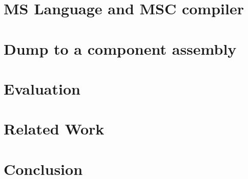 \documentclass{acm_proc_article-sp}
\begin{document}
\section{MS Language and MSC compiler}
\label{sect:msmsc}

\section{Dump to a component assembly}
\label{sect:component}

\section{Evaluation}
\label{sect:eval}

\section{Related Work}
\label{sect:related}

\section{Conclusion}
\label{sect:conclusion}



  
\end{document}

